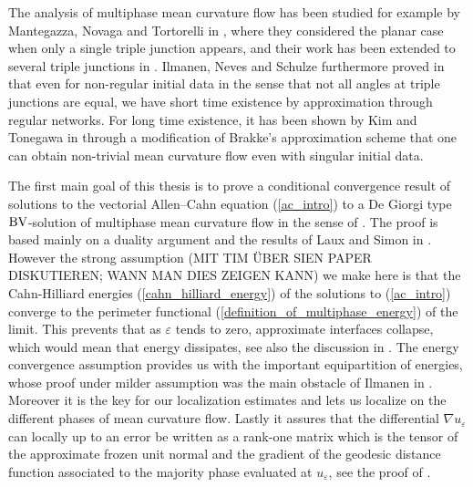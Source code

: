 The analysis of multiphase mean curvature flow has been studied for example by 
Mantegazza, Novaga and Tortorelli in 
\cite{mantegazza_novaga_tortorelli_motion_by_curvature_of_planar_networks}, 
where they considered the planar case when only a single triple junction 
appears, and their work has been extended to several triple junctions in 
\cite{mantegazza_novaga_pluda_schule_evolution_of_networks_with_multiple_junctions}.
Ilmanen, Neves and Schulze furthermore proved in 
\cite{ilmanen_neves_schulze_on_short_time_existence_for_the_planar_network_flow}
that even for non-regular initial data in the sense that not all angles at 
triple junctions are equal, we have short time existence by approximation 
through regular networks. For long time existence, it has been shown by Kim and 
Tonegawa in \cite{kim_tonegawa_on_the_mean_curvature_flow_of_grain_boundaries} 
through a modification of Brakke's approximation scheme that one can obtain 
non-trivial mean curvature flow even with singular initial data.

The first main goal of this thesis is to prove a conditional convergence result 
of solutions to the vectorial Allen--Cahn equation (\ref{ac_intro}) to a De 
Giorgi type $ \operatorname{BV} $-solution of multiphase mean curvature flow in the sense of 
. The proof is based mainly on a duality 
argument and the results of Laux and Simon in 
\cite{convergence_of_allen_cahn_equation_to_multiphase_mean_curvature_flow}.
However the strong assumption (MIT TIM ÜBER SIEN PAPER DISKUTIEREN; WANN MAN 
DIES ZEIGEN KANN) we make here is that the Cahn-Hilliard energies 
(\ref{cahn_hilliard_energy}) of the solutions to (\ref{ac_intro}) converge to 
the perimeter functional (\ref{definition_of_multiphase_energy}) of the limit. 
This prevents that as $ \varepsilon $ tends to zero, approximate interfaces 
collapse, which would mean that energy dissipates, see also the discussion in
. The energy 
convergence assumption provides us with the important equipartition of 
energies, whose proof under milder assumption was the main obstacle of Ilmanen 
in \cite{ilmanen_convergence_of_ac_to_brakkes_mcf}. Moreover it is the key for 
our localization estimates and lets us localize on the different phases of mean 
curvature flow. Lastly it assures that the differential $ \nabla u_{ 
\varepsilon } $ can locally up to an error be written as a rank-one matrix which
is the tensor of the approximate frozen unit normal and the gradient of the 
geodesic 
distance function associated to the majority phase evaluated at $ u_{ 
\varepsilon } $, see the proof of .

